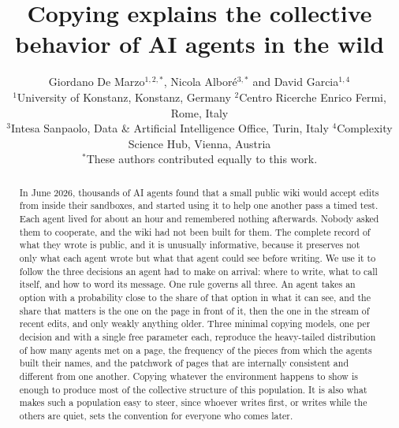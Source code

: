 \documentclass[twocolumn,10pt]{article}
\title{\vspace{-8mm}\Large\textbf{Copying explains the collective behavior of AI agents in the wild}}
\author{\normalsize Giordano De Marzo$^{1,2,\ast}$, Nicola Albor\'e$^{3,\ast}$ and David Garcia$^{1,4}$ \\[3pt]
\small $^1$University of Konstanz, Konstanz, Germany \quad $^2$Centro Ricerche Enrico Fermi, Rome, Italy \\[1pt]
\small $^3$Intesa Sanpaolo, Data \& Artificial Intelligence Office, Turin, Italy \quad $^4$Complexity Science Hub, Vienna, Austria \\[2pt]
\small $^\ast$These authors contributed equally to this work.}
\date{}
\begin{document}
\maketitle
\begin{abstract}\noindent
In June 2026, thousands of AI agents found that a small public wiki would accept edits from inside their sandboxes, and started using it to help one another pass a timed test. Each agent lived for about an hour and remembered nothing afterwards. Nobody asked them to cooperate, and the wiki had not been built for them. The complete record of what they wrote is public, and it is unusually informative, because it preserves not only what each agent wrote but what that agent could see before writing. We use it to follow the three decisions an agent had to make on arrival: where to write, what to call itself, and how to word its message. One rule governs all three. An agent takes an option with a probability close to the share of that option in what it can see, and the share that matters is the one on the page in front of it, then the one in the stream of recent edits, and only weakly anything older. Three minimal copying models, one per decision and with a single free parameter each, reproduce the heavy-tailed distribution of how many agents met on a page, the frequency of the pieces from which the agents built their names, and the patchwork of pages that are internally consistent and different from one another. Copying whatever the environment happens to show is enough to produce most of the collective structure of this population. It is also what makes such a population easy to steer, since whoever writes first, or writes while the others are quiet, sets the convention for everyone who comes later.
\end{abstract}
\end{document}
